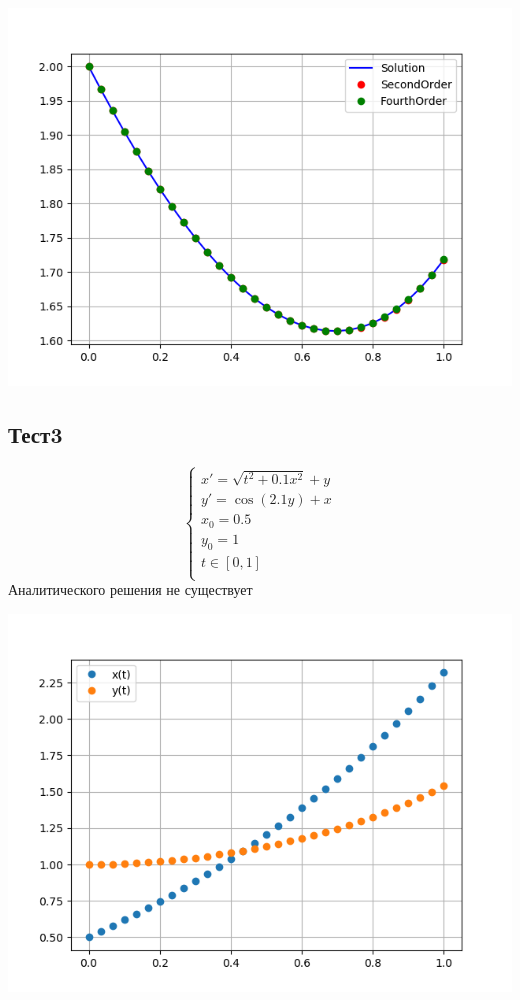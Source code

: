 \documentclass[a4paper,12pt,titlepage,finall]{article}
\begin{document}
\includegraphics[width=450pt]{Graphics/0.1.png}\newline
\newpage
\subsection{Тест3}
\begin{equation*}
 \begin{cases}
   x' = \sqrt{t^2 + 0.1x^2} + y\\
   y' = \cos{(2.1y)} + x\\
   x_0 = 0.5\\
   y_0 = 1\\
   t \in [0, 1]\\
 \end{cases}
\end{equation*}
Аналитического решения не существует\newline

\includegraphics[width=450pt]{Graphics/1.0.png}\newline
\newpage
\end{document}
